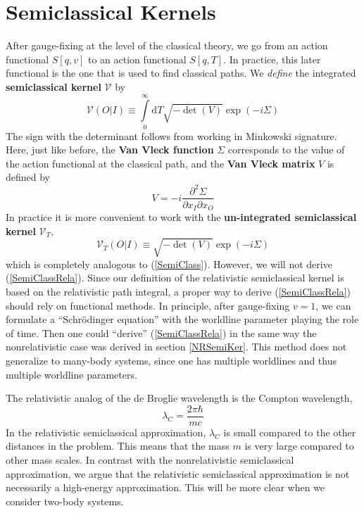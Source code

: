 \section{Semiclassical Kernels}
After gauge-fixing at the level of the classical theory, we go from an action functional $S[q, v]$ to an action functional $S[q, T]$. In practice, this later functional is the one that is used to find classical paths. We \textit{define} the integrated \textbf{semiclassical kernel} $\mathcal{V}$ by
\begin{equation}
	\mathcal{V}(O|I) \equiv \int\limits_{0}^{\infty} \mathrm{d}T \sqrt{-\det{(V)}} \exp{\left( -i \Sigma \right)}
\end{equation}
The sign with the determinant follows from working in Minkowski signature. Here, just like before, the \textbf{Van Vleck function} $\Sigma$ corresponds to the value of the action functional at the classical path, and the \textbf{Van Vleck matrix} $V$ is defined by
\begin{equation}
	V = -i \frac{\partial^{2} \Sigma}{\partial x_{I} \partial x_{O}}
\end{equation}
In practice it is more convenient to work with the \textbf{un-integrated semiclassical kernel} $\mathcal{V}_{T}$,
\begin{equation}
	\mathcal{V}_{T}(O|I) \equiv \sqrt{-\det{(V)}} \exp{\left( -i \Sigma \right)} \label{SemiClassRela}
\end{equation}
which is completely analogous to (\ref{SemiClass}). However, we will not derive (\ref{SemiClassRela}). Since our definition of the relativistic semiclassical kernel is based on the relativistic path integral, a proper way to derive (\ref{SemiClassRela}) should rely on functional methods. In principle, after gauge-fixing $v = 1$, we can formulate a ``Schr\"{o}dinger equation'' with the worldline parameter playing the role of time. Then one could ``derive'' (\ref{SemiClassRela}) in the same way the nonrelativistic case was derived in section \ref{NRSemiKer}. This method does not generalize to many-body systems, since one has multiple worldlines and thus multiple worldline parameters.

The relativistic analog of the de Broglie wavelength is the Compton wavelength,
\begin{equation}
	\lambda_{C} = \frac{2 \pi \hbar}{m c}
\end{equation}
In the relativistic semiclassical approximation, $\lambda_{C}$ is small compared to the other distances in the problem. This means that the mass $m$ is very large compared to other mass scales. In contrast with the nonrelativistic semiclassical approximation, we argue that the relativistic semiclassical approximation is not necessarily a high-energy approximation. This will be more clear when we consider two-body systems.
